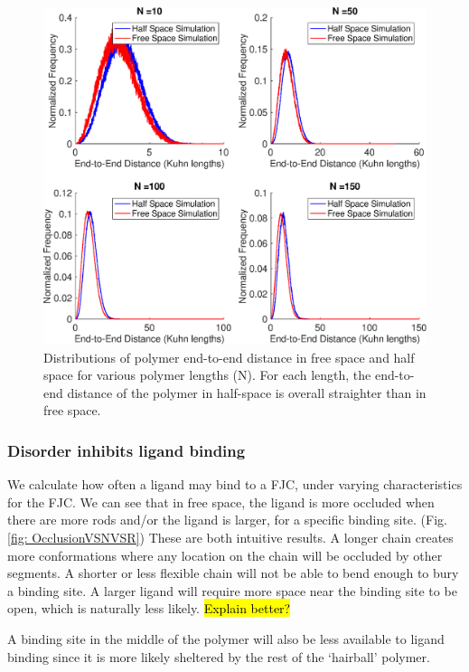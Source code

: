 \documentclass[../../AdvancementSummary.tex]{subfiles}
\begin{document}
\begin{figure}[H]
	\begin{center}
		\includegraphics[width=0.8\linewidth]{ResultsFigures/General/ReeDistributionHalfVSFreeSim.eps}
		\caption{Distributions of polymer end-to-end distance in free space and half space for various polymer lengths (N). For each length, the end-to-end distance of the polymer in half-space is overall straighter than in free space.\label{fig: ReeHalfVSFree}}
	\end{center}
\end{figure}

\subsubsection{Disorder inhibits ligand binding}

We calculate how often a ligand may bind to a FJC, under varying characteristics for the FJC. We can see that in free space, the ligand is more occluded when there are more rods and/or the ligand is larger, for a specific binding site. (Fig. \ref{fig: OcclusionVSNVSR}) These are both intuitive results. A longer chain creates more conformations where any location on the chain will be occluded by other segments.  A shorter or less flexible chain will not be able to bend enough to bury a binding site.  A larger ligand will require more space near the binding site to be open, which is naturally less likely. \hl{Explain better?}

A binding site in the middle of the polymer will also be less available to ligand binding since it is more likely sheltered by the rest of the `hairball' polymer. 
\end{document}
